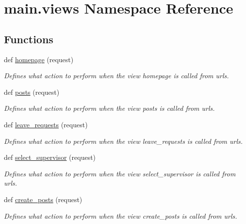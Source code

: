 \hypertarget{namespacemain_1_1views}{}\section{main.\+views Namespace Reference}
\label{namespacemain_1_1views}
\subsection*{Functions}
\begin{DoxyCompactItemize}
\item 
def \hyperlink{namespacemain_1_1views_a65a9dba6e3878ee1da013593b60345d4}{homepage} (request)
\begin{DoxyCompactList}\small\item\em Defines what action to perform when the view \textquotesingle{}homepage\textquotesingle{} is called from urls. \end{DoxyCompactList}\item 
def \hyperlink{namespacemain_1_1views_a33ddb0f904d196b5830dbb9a1a8f1282}{posts} (request)
\begin{DoxyCompactList}\small\item\em Defines what action to perform when the view \textquotesingle{}posts\textquotesingle{} is called from urls. \end{DoxyCompactList}\item 
def \hyperlink{namespacemain_1_1views_acdd49ab16815f9d6cb3e88feab0bfa80}{leave\+\_\+requests} (request)
\begin{DoxyCompactList}\small\item\em Defines what action to perform when the view \textquotesingle{}leave\+\_\+requests\textquotesingle{} is called from urls. \end{DoxyCompactList}\item 
def \hyperlink{namespacemain_1_1views_abdf62da100e2d6945871318f111c478c}{select\+\_\+supervisor} (request)
\begin{DoxyCompactList}\small\item\em Defines what action to perform when the view \textquotesingle{}select\+\_\+supervisor\textquotesingle{} is called from urls. \end{DoxyCompactList}\item 
def \hyperlink{namespacemain_1_1views_a5188f01b8c7ed850b1f946afb34d183a}{create\+\_\+posts} (request)
\begin{DoxyCompactList}\small\item\em Defines what action to perform when the view \textquotesingle{}create\+\_\+posts\textquotesingle{} is called from urls. \end{DoxyCompactList}\item 

\end{DoxyCompactItemize}
